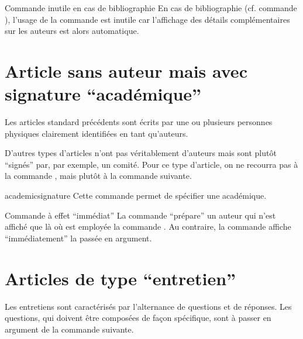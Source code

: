 \begin{dbwarning}{Commande \protect{} inutile
    en cas de bibliographie}{}
  En cas de bibliographie (cf. commande ), l'usage de
  la commande  est inutile car l'affichage des
  détails complémentaires sur les auteurs est alors automatique.
\end{dbwarning}

\section{Article sans auteur mais avec signature \enquote{académique}}
\label{sec-article-sans-auteur}

Les articles standard précédents sont écrits par une ou plusieurs personnes
physiques clairement identifiées en tant qu'auteurs.

D'autres types d'articles n'ont pas véritablement d'auteurs mais sont plutôt
\enquote{signés} par, par exemple, un comité. Pour ce type d'article, on ne
recourra pas à la commande , mais plutôt à la commande
 suivante.

\begin{docCommand}{academicsignature}{}
  Cette commande permet de spécifier une  académique.
\end{docCommand}

\begin{bodycode}
\end{bodycode}

\begin{dbwarning}{Commande \protect{} à effet \enquote{immédiat}}{}
  La commande  \enquote{prépare} un auteur qui n'est affiché que
  là où est employée la commande . Au contraire, la commande
   affiche \enquote{immédiatement} la 
  passée en argument.
\end{dbwarning}

\section{Articles de type \enquote{entretien}}
\label{sec-entretiens}

Les entretiens sont caractérisés par l'alternance de questions et de
réponses. Les questions, qui doivent être composées de façon spécifique, sont
à passer en argument de la commande  suivante.

